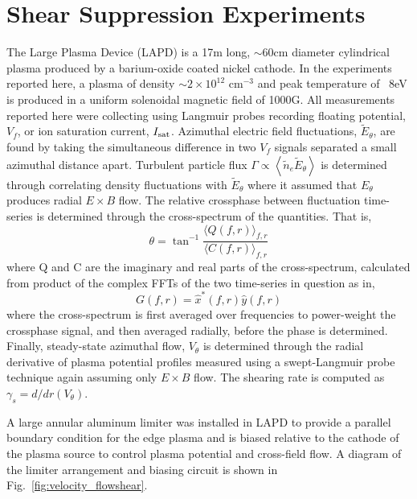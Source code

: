 \documentclass[aip,pop,amsmath,amssymb,preprint,superscriptaddress]{revtex4-1} %
\begin{document}
\section{Shear Suppression Experiments}

The Large Plasma Device \cite{gek91} (LAPD) is a 17m long, $\sim$60cm diameter cylindrical plasma produced by a barium-oxide coated nickel cathode. In the experiments reported here, a plasma of density $\sim$$2 \times 10^{12}$ cm$^{-3}$ and peak temperature of ~8eV is produced in a uniform solenoidal magnetic field of 1000G. All measurements reported here were collecting using Langmuir probes recording floating potential, $V_{f}$, or ion saturation current, $I_{\rm sat}$. Azimuthal electric field fluctuations, $\tilde{E}_{\theta}$, are found by taking the simultaneous difference in two $V_{f}$ signals separated a small azimuthal distance apart. Turbulent particle flux $\Gamma \propto \left<\tilde{n}_e \tilde{E}_\theta\right>$ is determined through correlating density fluctuations with $\tilde{E}_{\theta}$ where it assumed that $E_{\theta}$ produces radial $E \times B$ flow. The relative crossphase between fluctuation time-series is determined through the cross-spectrum of the quantities. That is,
%
\begin{equation}
\theta = \tan^{-1}\frac{\langle Q(f,r)\rangle_{f,r}}{\langle C(f,r)\rangle_{f,r}}
\label{eq:crossphase}
\end{equation}
%
where Q and C are the imaginary and real parts of the cross-spectrum, calculated from product of the complex FFTs of the two time-series in question as in,
\begin{equation}
G(f,r) = \hat{x}^{\ast}(f,r)\hat{y}(f,r)
\label{eq:crossspectrum}
\end{equation}
%
where the cross-spectrum is first averaged over frequencies to power-weight the crossphase signal, and then averaged radially, before the phase is determined. Finally, steady-state azimuthal flow, $V_{\theta}$ is determined through the radial derivative of plasma potential profiles measured using a swept-Langmuir probe technique again assuming only $E \times B$ flow. The shearing rate is computed as $\gamma_{s} = d/dr(V_{\theta})$.

A large annular aluminum limiter was installed in LAPD to provide a parallel boundary condition for the edge plasma and is biased relative to the cathode of the plasma source to control plasma potential and cross-field flow.  A diagram of the limiter arrangement and biasing circuit is shown in Fig.~\ref{fig:velocity_flowshear}.
\end{document}

